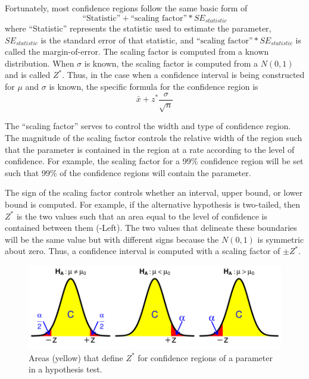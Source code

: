\documentclass[10pt,openany]{book}\usepackage[]{graphicx}\usepackage[]{color}
\newenvironment{knitrout}{}{} %
\begin{document}
Fortunately, most confidence regions follow the same basic form of
  \[ \text{``Statistic''} + \text{``scaling factor''} * SE_{statistic} \]
where ``Statistic'' represents the statistic used to estimate the parameter, $SE_{statistic}$ is the standard error of that statistic, and $\text{``scaling factor''}*SE_{statistic}$ is called the margin-of-error. The scaling factor is computed from a known distribution. When $\sigma$ is known, the scaling factor is computed from a $N(0,1)$ and is called $Z^{*}$. Thus, in the case when a confidence interval is being constructed for $\mu$ and $\sigma$ is known, the specific formula for the confidence region is
  \[ \bar{x} + z^{*}\frac{\sigma}{\sqrt{n}} \]

\vspace{-8pt}
The ``scaling factor'' serves to control the width and type of confidence region. The magnitude of the scaling factor controls the relative width of the region such that the parameter is contained in the region at a rate according to the level of confidence. For example, the scaling factor for a 99\% confidence region will be set such that 99\% of the confidence regions will contain the parameter.

The sign of the scaling factor controls whether an interval, upper bound, or lower bound is computed. For example, if the alternative hypothesis is two-tailed, then $Z^{*}$ is the two values such that an area equal to the level of confidence is contained between them (-Left). The two values that delineate these boundaries will be the same value but with different signs because the $N(0,1)$ is symmetric about zero. Thus, a confidence interval is computed with a scaling factor of $\pm Z^{*}$.

\begin{knitrout}
\color{fgcolor}\begin{figure}[hbtp]

{\centering \includegraphics[width=.8\linewidth]{Figs/CIboundsZ-1} 

}

\caption[Areas (yellow) that define $Z^{*}$ for confidence regions of a parameter in a hypothesis test]{Areas (yellow) that define $Z^{*}$ for confidence regions of a parameter in a hypothesis test.}\label{fig:CIboundsZ}
\end{figure}


\end{knitrout}
\end{document}
